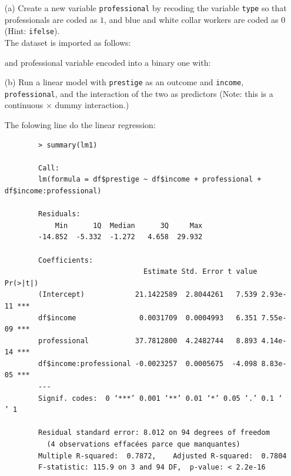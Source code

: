 \documentclass[12pt,letterpaper]{article}
\begin{document}
\newpage
\begin{enumerate}
	
	\item [(a)]
	Create a new variable \texttt{professional} by recoding the variable \texttt{type} so that professionals are coded as $1$, and blue and white collar workers are coded as $0$ (Hint: \texttt{ifelse}).\\
	
	The dataset is imported as follows:
	  
	
	and professional variable encoded into a binary one with:
	  
	
	
	\item [(b)]
	Run a linear model with \texttt{prestige} as an outcome and \texttt{income}, \texttt{professional}, and the interaction of the two as predictors (Note: this is a continuous $\times$ dummy interaction.)
	
	The folowing line do the linear regression:
	  	
	
	\begin{verbatim}
		> summary(lm1)

		Call:
		lm(formula = df$prestige ~ df$income + professional + df$income:professional)
		
		Residuals:
		    Min      1Q  Median      3Q     Max 
		-14.852  -5.332  -1.272   4.658  29.932 
		
		Coefficients:
		                         Estimate Std. Error t value Pr(>|t|)    
		(Intercept)            21.1422589  2.8044261   7.539 2.93e-11 ***
		df$income               0.0031709  0.0004993   6.351 7.55e-09 ***
		professional           37.7812800  4.2482744   8.893 4.14e-14 ***
		df$income:professional -0.0023257  0.0005675  -4.098 8.83e-05 ***
		---
		Signif. codes:  0 ‘***’ 0.001 ‘**’ 0.01 ‘*’ 0.05 ‘.’ 0.1 ‘ ’ 1
		
		Residual standard error: 8.012 on 94 degrees of freedom
		  (4 observations effacées parce que manquantes)
		Multiple R-squared:  0.7872,	Adjusted R-squared:  0.7804 
		F-statistic: 115.9 on 3 and 94 DF,  p-value: < 2.2e-16
	\end{verbatim}
	
	


\end{enumerate}
\end{document}
